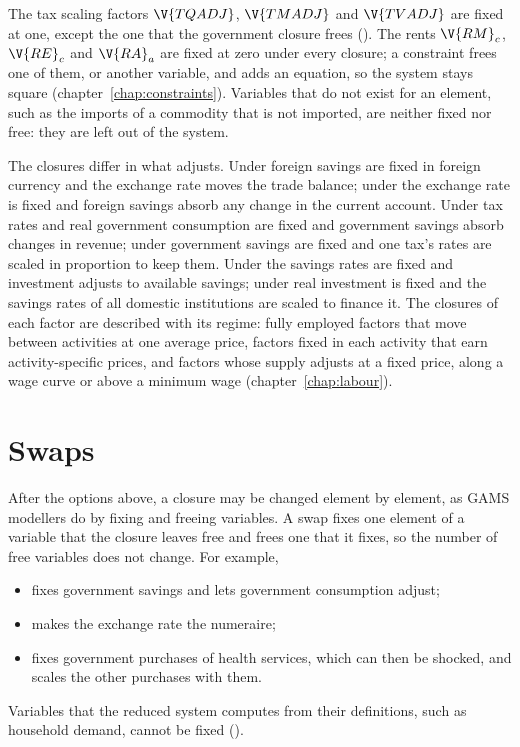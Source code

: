 The tax scaling factors $\V{TQADJ}$, $\V{TMADJ}$ and $\V{TVADJ}$ are fixed at
one, except the one that the government closure frees
(). The rents $\V{RM}_c$, $\V{RE}_c$ and $\V{RA}_a$ are
fixed at zero under every closure; a constraint frees one of them, or another
variable, and adds an equation, so the system stays square
(chapter~\ref{chap:constraints}). Variables that do not exist for an element,
such as the imports of a commodity that is not imported, are neither fixed
nor free: they are left out of the system.

The closures differ in what adjusts. Under  foreign savings are
fixed in foreign currency and the exchange rate moves the trade balance;
under  the exchange rate is fixed and foreign savings absorb any
change in the current account. Under  tax rates and real
government consumption are fixed and government savings absorb changes in
revenue; under  government savings are fixed and one tax's rates
are scaled in proportion to keep them. Under  the savings rates
are fixed and investment adjusts to available savings; under
 real investment is fixed and the savings rates of all
domestic institutions are scaled to finance it. The closures of each factor
are described with its regime: fully employed factors that move between
activities at one average price, factors fixed in each activity that earn
activity-specific prices, and factors whose supply adjusts at a fixed price,
along a wage curve or above a minimum wage (chapter~\ref{chap:labour}).

\section{Swaps}\label{sec:swaps}

After the options above, a closure may be changed element by element, as
GAMS modellers do by fixing and freeing variables. A swap fixes one element of
a variable that the closure leaves free and frees one that it fixes, so the
number of free variables does not change. For example,
\begin{itemize}
\item {} fixes government savings and lets government
consumption adjust;
\item {} makes the exchange rate the numeraire;
\item {} fixes government purchases of health
services, which can then be shocked, and scales the other purchases with
them.
\end{itemize}
Variables that the reduced system computes from their definitions, such as
household demand, cannot be fixed ().

